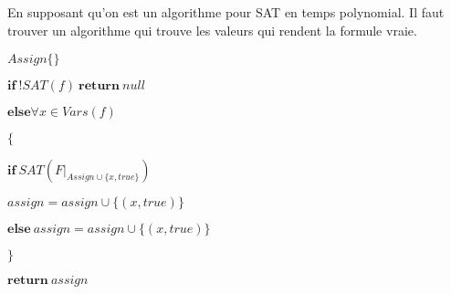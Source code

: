 \subsection{}

En supposant qu'on est un algorithme pour SAT en temps polynomial. Il faut trouver un algorithme qui trouve les valeurs qui rendent la formule vraie.

\begin{framed}
$Assign\{\}$

$\textbf{if}\ !SAT(f)\ \textbf{return}\ null$

$\textbf{else} \forall x \in Vars(f)$

$\{$

$\textbf{if}\ SAT(F|_{Assign\cup \{x, true\}})$

$assign = assign \cup \{(x,true)\}$

$\textbf{else}\ assign = assign \cup \{(x,true)\}$

$\}$

$\textbf{return}\ assign$
\end{framed}

\subsection{}
\nosolution